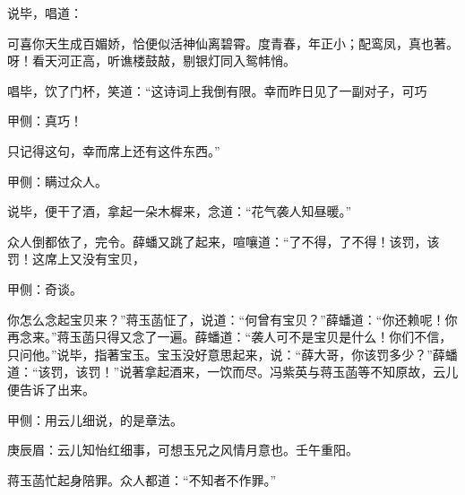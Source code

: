 \begin{parag}
    说毕，唱道：
\end{parag}

\begin{qute2sp}
    \begin{poem}
        \begin{pl}可喜你天生成百媚娇，恰便似活神仙离碧霄。度青春，年正小；配鸾凤，真也著。呀！看天河正高，听谯楼鼓敲，剔银灯同入鸳帏悄。\end{pl}
    \end{poem}
\end{qute2sp}


\begin{parag}
    唱毕，饮了门杯，笑道：“这诗词上我倒有限。幸而昨日见了一副对子，可巧\begin{note}甲侧：真巧！\end{note}只记得这句，幸而席上还有这件东西。”\begin{note}甲侧：瞒过众人。\end{note}说毕，便干了酒，拿起一朵木樨来，念道：“花气袭人知昼暖。”
\end{parag}


\begin{parag}
    众人倒都依了，完令。薛蟠又跳了起来，喧嚷道：“了不得，了不得！该罚，该罚！这席上又没有宝贝，\begin{note}甲侧：奇谈。\end{note}你怎么念起宝贝来？”蒋玉菡怔了，说道：“何曾有宝贝？”薛蟠道：“你还赖呢！你再念来。”蒋玉菡只得又念了一遍。薛蟠道：“袭人可不是宝贝是什么！你们不信，只问他。”说毕，指著宝玉。宝玉没好意思起来，说：“薛大哥，你该罚多少？”薛蟠道：“该罚，该罚！”说著拿起酒来，一饮而尽。冯紫英与蒋玉菡等不知原故，云儿便告诉了出来。\begin{note}甲侧：用云儿细说，的是章法。\end{note}\begin{note}庚辰眉：云儿知怡红细事，可想玉兄之风情月意也。壬午重阳。\end{note}蒋玉菡忙起身陪罪。众人都道：“不知者不作罪。”
\end{parag}


